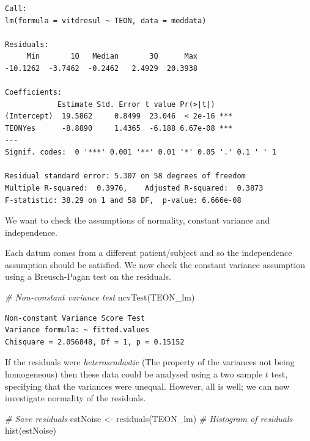 \documentclass[
  oneside]{krantz}
\newenvironment{Shaded}{\begin{snugshade}}{\end{snugshade}}
\newcommand{\CommentTok}[1]{\textcolor[rgb]{0.56,0.35,0.01}{\textit{#1}}}
\newcommand{\FunctionTok}[1]{\textcolor[rgb]{0.00,0.00,0.00}{#1}}
\newcommand{\NormalTok}[1]{#1}
\newcommand{\OtherTok}[1]{\textcolor[rgb]{0.56,0.35,0.01}{#1}}
\begin{document}
\begin{verbatim}
Call:
lm(formula = vitdresul ~ TEON, data = meddata)

Residuals:
     Min       1Q   Median       3Q      Max 
-10.1262  -3.7462  -0.2462   2.4929  20.3938 

Coefficients:
            Estimate Std. Error t value Pr(>|t|)    
(Intercept)  19.5862     0.8499  23.046  < 2e-16 ***
TEONYes      -8.8890     1.4365  -6.188 6.67e-08 ***
---
Signif. codes:  0 '***' 0.001 '**' 0.01 '*' 0.05 '.' 0.1 ' ' 1

Residual standard error: 5.307 on 58 degrees of freedom
Multiple R-squared:  0.3976,    Adjusted R-squared:  0.3873 
F-statistic: 38.29 on 1 and 58 DF,  p-value: 6.666e-08
\end{verbatim}

We want to check the assumptions of normality, constant variance and independence.

Each datum comes from a different patient/subject and so the independence assumption should be satisfied. We now check the constant variance assumption using a Breusch-Pagan test on the residuals.

\begin{Shaded}
\begin{Highlighting}[]
\CommentTok{\# Non{-}constant variance test}
\FunctionTok{ncvTest}\NormalTok{(TEON\_lm)}
\end{Highlighting}
\end{Shaded}

\begin{verbatim}
Non-constant Variance Score Test 
Variance formula: ~ fitted.values 
Chisquare = 2.056848, Df = 1, p = 0.15152
\end{verbatim}

If the residuals were \emph{heteroscadastic} (The property of the variances not being homogeneous) then these data could be analysed using a two sample \(t\) test, specifying that the variances were unequal. However, all is well; we can now investigate normality of the residuals.

\begin{Shaded}
\begin{Highlighting}[]
\CommentTok{\# Save residuals}
\NormalTok{estNoise }\OtherTok{\textless{}{-}} \FunctionTok{residuals}\NormalTok{(TEON\_lm) }
\CommentTok{\# Histogram of residuals }
\FunctionTok{hist}\NormalTok{(estNoise) }
\end{Highlighting}
\end{Shaded}
\end{document}
